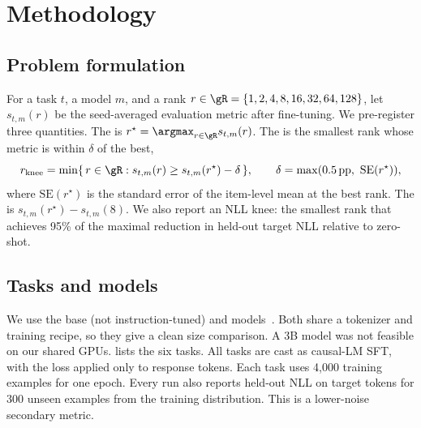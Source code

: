 \section{Methodology}
\label{sec:method}

\subsection{Problem formulation}
For a task $t$, a model $m$, and a \lora rank $r \in \gR = \{1,2,4,8,16,32,64,128\}$, let $s_{t,m}(r)$ be the seed-averaged evaluation metric after fine-tuning. We pre-register three quantities.
The  is $r^\star = \argmax_{r \in \gR} s_{t,m}(r)$.
The  is the smallest rank whose metric is within $\delta$ of the best,
\begin{equation}
r_{\text{knee}} = \min\{\, r \in \gR : s_{t,m}(r) \geq s_{t,m}(r^\star) - \delta \,\}, \qquad \delta = \max(0.5\,\text{pp},\ \mathrm{SE}(r^\star)),
\end{equation}
where $\mathrm{SE}(r^\star)$ is the standard error of the item-level mean at the best rank.
The  is $s_{t,m}(r^\star) - s_{t,m}(8)$.
We also report an NLL knee: the smallest rank that achieves 95\% of the maximal reduction in held-out target NLL relative to zero-shot.

\subsection{Tasks and models}
We use the base (not instruction-tuned) \qsmall and \qlarge models~\citep{qwen2024qwen25}. Both share a tokenizer and training recipe, so they give a clean size comparison. A 3B model was not feasible on our shared GPUs.  lists the six tasks. All tasks are cast as causal-LM SFT, with the loss applied only to response tokens. Each task uses 4,000 training examples for one epoch. Every run also reports held-out NLL on target tokens for 300 unseen examples from the training distribution. This is a lower-noise secondary metric.

